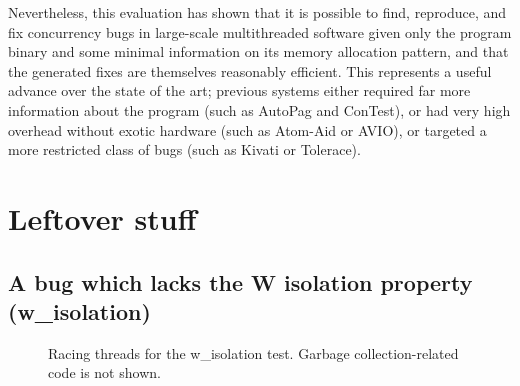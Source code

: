 Nevertheless, this evaluation has shown that it is possible to find,
reproduce, and fix concurrency bugs in large-scale multithreaded
software given only the program binary and some minimal information on
its memory allocation pattern, and that the generated fixes are
themselves reasonably efficient.  This represents a useful advance
over the state of the art; previous systems either required far more
information about the program (such as AutoPag\needCite{} and
ConTest\needCite{}), or had very high overhead without exotic hardware
(such as Atom-Aid\needCite{} or AVIO\needCite{}), or targeted a more
restricted class of bugs (such as Kivati\needCite{} or
Tolerace\needCite{}).

\section{Leftover stuff}

\subsection{A bug which lacks the W isolation property (w\_isolation)}

\begin{figure}
  \centerline{
    {\hfill}
    {\hfill}
    {\hfill}
  }
  \caption{Racing threads for the w\_isolation test.  Garbage
    collection-related code is not shown.}
  \label{fig:w_isolation}
\end{figure}


